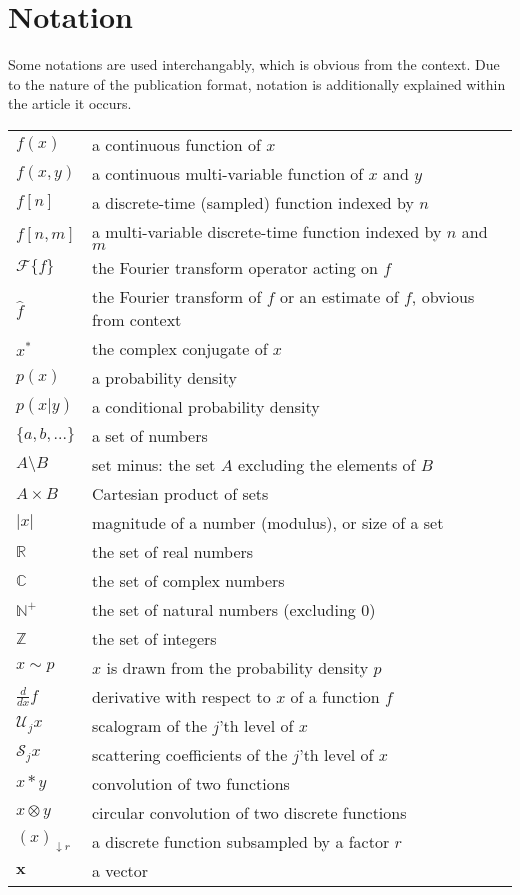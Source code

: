 \section*{Notation}
Some notations are used interchangably, which is obvious from the context. Due to the nature of the publication format, notation is additionally explained within the article it occurs.

\begin{tabular}{p{} p{}}
    $f(x)$ & a continuous function of $x$ \\
    $f(x, y)$ & a continuous multi-variable function of $x$ and $y$ \\
    $f[n]$ & a discrete-time (sampled) function indexed by $n$ \\
    $f[n, m]$ & a multi-variable discrete-time function indexed by $n$ and $m$ \\
    $\mathcal{F} \{f\}$ & the Fourier transform operator acting on $f$\\
    $\hat{f}$ & the Fourier transform of $f$ or an estimate of $f$, obvious from context\\
    $x^*$ & the complex conjugate of $x$\\
    $p(x)$ & a probability density \\
    $p(x|y)$ & a conditional probability density \\
    $\{a, b, ...\}$ & a set of numbers\\
    $A \setminus B$ & set minus: the set $A$ excluding the elements of $B$\\
    $A \times B$ & Cartesian product of sets\\
    $| x |$ & magnitude of a number (modulus), or size of a set\\
    $\mathbb{R}$ & the set of real numbers\\
    $\mathbb{C}$ & the set of complex numbers\\
    $\mathbb{N^+}$ & the set of natural numbers (excluding 0)\\
    $\mathbb{Z}$ & the set of integers\\
    $x \sim p$ & $x$ is drawn from the probability density $p$\\
    $\frac{d}{dx} f$ & derivative with respect to $x$ of a function $f$\\
    $\mathcal{U}_j x$ & scalogram of the $j$'th level of $x$\\
    $\mathcal{S}_j x$ & scattering coefficients of the $j$'th level of $x$\\
    $x * y$ & convolution of two functions\\
    $x \otimes y$ & circular convolution of two discrete functions\\
    $(x)_{\downarrow r}$ & a discrete function subsampled by a factor $r$\\
    $\mathbf{x}$ & a vector\\
\end{tabular}


